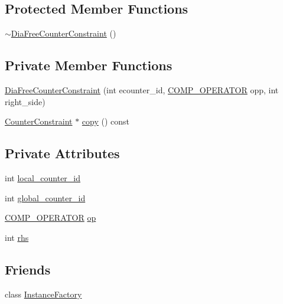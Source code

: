 \subsection*{Protected Member Functions}
\begin{DoxyCompactItemize}
\item 
\mbox{\hyperlink{classgraphsat_1_1_dia_free_counter_constraint_a15c19c486802cb8196f8decf83b1475c}{$\sim$\+Dia\+Free\+Counter\+Constraint}} ()
\end{DoxyCompactItemize}
\subsection*{Private Member Functions}
\begin{DoxyCompactItemize}
\item 
\mbox{\hyperlink{classgraphsat_1_1_dia_free_counter_constraint_af0fe74a0aece8727e6eb5733435ce03a}{Dia\+Free\+Counter\+Constraint}} (int ecounter\+\_\+id, \mbox{\hyperlink{namespacegraphsat_acfb5939f9bdafbd9aea0d084b9a56f69}{C\+O\+M\+P\+\_\+\+O\+P\+E\+R\+A\+T\+OR}} opp, int right\+\_\+side)
\item 
\mbox{\hyperlink{classgraphsat_1_1_counter_constraint}{Counter\+Constraint}} $\ast$ \mbox{\hyperlink{classgraphsat_1_1_dia_free_counter_constraint_a1405e3fcda5895d1a3d274670a43699e}{copy}} () const
\end{DoxyCompactItemize}
\subsection*{Private Attributes}
\begin{DoxyCompactItemize}
\item 
int \mbox{\hyperlink{classgraphsat_1_1_dia_free_counter_constraint_a9cd24e84777d17db9f835749dae7b7da}{local\+\_\+counter\+\_\+id}}
\item 
int \mbox{\hyperlink{classgraphsat_1_1_dia_free_counter_constraint_ab4e529cf4a4f05198fec533274bd2862}{global\+\_\+counter\+\_\+id}}
\item 
\mbox{\hyperlink{namespacegraphsat_acfb5939f9bdafbd9aea0d084b9a56f69}{C\+O\+M\+P\+\_\+\+O\+P\+E\+R\+A\+T\+OR}} \mbox{\hyperlink{classgraphsat_1_1_dia_free_counter_constraint_a72c76e83f7b060ae41c6056714d1abc2}{op}}
\item 
int \mbox{\hyperlink{classgraphsat_1_1_dia_free_counter_constraint_a71e44a5e077a5d910db1a9a6676fb473}{rhs}}
\end{DoxyCompactItemize}
\subsection*{Friends}
\begin{DoxyCompactItemize}
\item 
class \mbox{\hyperlink{classgraphsat_1_1_dia_free_counter_constraint_ad4b3c25c041701ae56dc1e78df779d2f}{Instance\+Factory}}
\end{DoxyCompactItemize}


